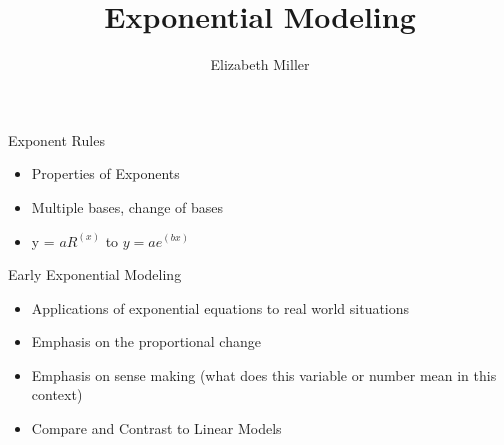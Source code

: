 \documentclass{ximera}
\author{Elizabeth Miller}
\title{Exponential Modeling}
\begin{document}
\begin{abstract}
\end{abstract}
\maketitle


\begin{objectives}

\item Exponent Rules 
\begin{itemize}
	\item Properties of Exponents 
	\item Multiple bases, change of bases  
	\item y = $aR^(x)$ to $y = ae^(bx)$ 
\end{itemize}

\item Early Exponential Modeling
\begin{itemize}
	\item Applications of exponential equations to real world situations 
	\item Emphasis on the proportional change   
	\item Emphasis on sense making (what does this variable or number mean in this context) 
	\item Compare and Contrast to Linear Models 
\end{itemize}


\end{objectives}
\end{document}

